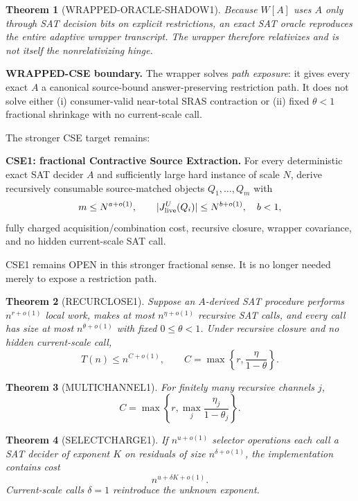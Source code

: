 \documentclass[11pt]{article}
\theoremstyle{plain}
\newtheorem{theorem}{Theorem}[section]
\theoremstyle{definition}
\theoremstyle{remark}
\begin{document}
\begin{theorem}[WRAPPED-ORACLE-SHADOW1]
Because \(W[A]\) uses \(A\) only through SAT decision bits on explicit
restrictions, an exact SAT oracle reproduces the entire adaptive wrapper
transcript.  The wrapper therefore relativizes and is not itself the
nonrelativizing hinge.
\end{theorem}

\begin{provedbox}
\textbf{WRAPPED-CSE boundary.}
The wrapper solves \emph{path exposure}: it gives every exact \(A\) a
canonical source-bound answer-preserving restriction path.  It does not solve
either (i) consumer-valid near-total SRAS contraction or (ii) fixed
\(\theta<1\) fractional shrinkage with no current-scale call.
\end{provedbox}

The stronger CSE target remains:

\begin{candidatebox}
\textbf{CSE1: fractional Contractive Source Extraction.}
For every deterministic exact SAT decider \(A\) and sufficiently large hard
instance of scale \(N\), derive recursively consumable source-matched objects
\(Q_1,\ldots,Q_m\) with
\[
m\le N^{a+o(1)},\qquad
|J_{\rm live}^{U}(Q_i)|\le N^{b+o(1)},\quad b<1,
\]
fully charged acquisition/combination cost, recursive closure, wrapper
covariance, and no hidden current-scale SAT call.
\end{candidatebox}

CSE1 remains OPEN in this stronger fractional sense.  It is no longer needed
merely to expose a restriction path.

\begin{theorem}[RECURCLOSE1]
Suppose an \(A\)-derived SAT procedure performs \(n^{r+o(1)}\) local work,
makes at most \(n^{\eta+o(1)}\) recursive SAT calls, and every call has size at
most \(n^{\theta+o(1)}\) with fixed \(0\le\theta<1\).  Under recursive closure
and no hidden current-scale call,
\[
\boxed{
T(n)\le n^{C+o(1)},
\qquad
C=\max\left\{r,\frac{\eta}{1-\theta}\right\}.
}
\]
\end{theorem}

\begin{theorem}[MULTICHANNEL1]
For finitely many recursive channels \(j\),
\[
C=
\max\left\{
r,\max_j\frac{\eta_j}{1-\theta_j}
\right\}.
\]
\end{theorem}

\begin{theorem}[SELECTCHARGE1]
If \(n^{u+o(1)}\) selector operations each call a SAT decider of exponent
\(K\) on residuals of size \(n^{\delta+o(1)}\), the implementation contains
cost
\[
\boxed{n^{u+\delta K+o(1)}}.
\]
Current-scale calls \(\delta=1\) reintroduce the unknown exponent.
\end{theorem}
\end{document}
